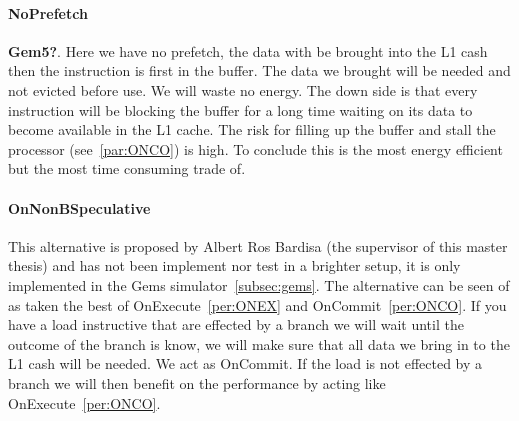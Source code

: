 \paragraph{NoPrefetch} \label{per:NOPR} \textbf{Gem5?}. Here we have no prefetch, the data with be brought into the L1 cash then the instruction is first in the buffer. The data we brought will be needed and not evicted before use. We will waste no energy. The down side is that every instruction will be blocking the buffer for a long time waiting on its data to become available in the L1 cache. The risk for filling up the buffer and stall the processor (see~\ref{par:ONCO}) is high. To conclude this is the most energy efficient but the most time consuming trade of.

\paragraph{OnNonBSpeculative} \label{per:ONBS} This alternative is proposed by Albert Ros Bardisa (the supervisor of this master thesis) and has not been implement nor test in a brighter setup, it is only implemented in the Gems simulator~\ref{subsec:gems}. The alternative can be seen of as taken the best of OnExecute~\ref{per:ONEX} and OnCommit~\ref{per:ONCO}. If you have a load instructive that are effected by a branch we will wait until the outcome of the branch is know, we will make sure that all data we bring in to the L1 cash will be needed. We act as OnCommit. If the load is not effected by a branch we will then benefit on the performance by acting like OnExecute~\ref{per:ONCO}.  






